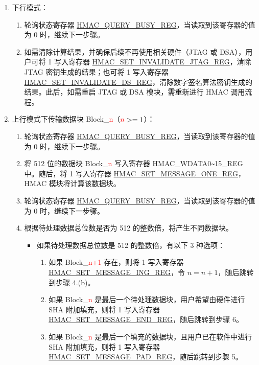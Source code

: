 \documentclass[main\_\_CN.tex]{subfiles}
\begin{document}
\begin{enumerate}
    \item 下行模式：
        \begin{enumerate}
            \item 轮询状态寄存器 \hyperref[regdesc:HMACQUERYBUSYREG]{HMAC\_QUERY\_BUSY\_REG}，当读取到该寄存器的值为 0 时，继续下一步骤。
            \item 如需清除计算结果，并确保后续不再使用相关硬件（JTAG 或 DSA），用户可将 1 写入寄存器 \hyperref[regdesc:HMACSETINVALIDATEJTAGREG]{HMAC\_SET\_INVALIDATE\_JTAG\_REG}，清除 JTAG 密钥生成的结果；也可将 1 写入寄存器 \hyperref[regdesc:HMACSETINVALIDATEDSREG]{HMAC\_SET\_INVALIDATE\_DS\_REG}，清除数字签名算法密钥生成的结果。此后，如需重启 JTAG 或 DSA 模块，需重新进行 HMAC 调用流程。
        \end{enumerate}

    \item 上行模式下传输数据块 Block\_\textcolor{red}{n}（$\textcolor{red}{n}>=1$）：
        \begin{enumerate}
            \item 轮询状态寄存器 \hyperref[regdesc:HMACQUERYBUSYREG]{HMAC\_QUERY\_BUSY\_REG}，当读取到该寄存器的值为 0 时，继续下一步骤。
            \item 将 512 位的数据块 Block\_\textcolor{red}{n} 写入寄存器 HMAC\_WDATA0\verb+~+15\_REG 中。随后，将 1 写入寄存器 \hyperref[regdesc:HMACSETMESSAGEONEREG]{HMAC\_SET\_MESSAGE\_ONE\_REG}，HMAC 模块将计算该数据块。
            \item 轮询状态寄存器 \hyperref[regdesc:HMACQUERYBUSYREG]{HMAC\_QUERY\_BUSY\_REG}，当读取到该寄存器的值为 0 时，继续下一步骤。
            \item 根据待处理数据总位数是否为 512 的整数倍，将产生不同数据块。
            \begin{itemize}
                \item 如果待处理数据总位数是 512 的整数倍，有以下 3 种选项：
                \begin{enumerate}
                    \item 如果 Block\_\textcolor{red}{n+1} 存在，则将 1 写入寄存器 \hyperref[regdesc:HMACSETMESSAGEINGREG]{HMAC\_SET\_MESSAGE\_ING\_REG}，令 $n=n+1$，随后跳转到步骤 4.(b)。
                    \item 如果 Block\_\textcolor{red}{n} 是最后一个待处理数据块，用户希望由硬件进行 SHA 附加填充，则将 1 写入寄存器 \hyperref[regdesc:HMACSETMESSAGEENDREG]{HMAC\_SET\_MESSAGE\_END\_REG}，随后跳转到步骤 6。
                    \item 如果 Block\_\textcolor{red}{n} 是最后一个填充的数据块，且用户已在软件中进行 SHA 附加填充，则将 1 写入寄存器 \hyperref[regdesc:HMACSETMESSAGEPADREG]{HMAC\_SET\_MESSAGE\_PAD\_REG}，随后跳转到步骤 5。

\end{enumerate}
\end{itemize}
\end{enumerate}
\end{enumerate}
\end{document}

